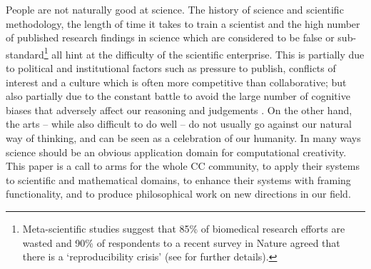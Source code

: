 \documentclass[letterpaper]{article}
\begin{document}
People are not naturally good at science. The history of science and
scientific methodology, the length of time it takes to train a
scientist and the high number of published research findings in
science which are considered to be false or
sub-standard\footnote{Meta-scientific studies suggest that 85\% of
  biomedical research efforts are wasted \cite{macleod} and 90\% of
  respondents to a recent survey in Nature agreed that there is a
  `reproducibility crisis' \cite{baker} (see \cite{munafo,ioannidis}
  for further details).} all hint at the difficulty of the scientific
enterprise. This is partially due to political and institutional
factors such as pressure to publish, conflicts of interest and a
culture which is often more competitive than collaborative; but also
partially due to the constant battle to avoid the large number of
cognitive biases that adversely affect our reasoning and judgements
\cite{haselton,sutherland}. On the other hand, the arts -- while also
difficult to do well -- do not usually go against our natural way of
thinking, and can be seen as a celebration of our humanity.  In many
ways science should be an obvious application domain for computational
creativity.  This paper is a call to arms for the whole CC community,
to apply their systems to scientific and mathematical domains, to
enhance their systems with framing functionality, and to produce
philosophical work on new directions in our field.








\end{document}
